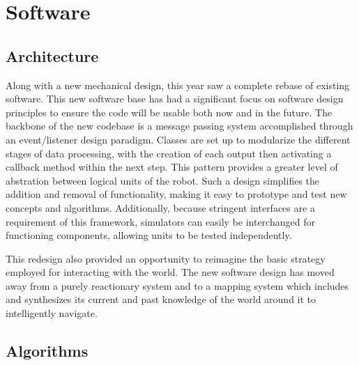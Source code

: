 

\section{Software}
\subsection{Architecture}
Along with a new mechanical design, this year saw a complete rebase of existing software. This new software base has had a significant focus on software design principles to ensure the code will be usable both now and in the future. The backbone of the new codebase is a message passing system accomplished through an event/listener design paradigm. Classes are set up to modularize the different stages of data processing, with the creation of each output then activating a callback method within the next step. This pattern provides a greater level of abstration between logical units of the robot. Such a design simplifies the addition and removal of functionality, making it easy to prototype and test new concepts and algorithms. Additionally, because stringent interfaces are a requirement of this framework, simulators can easily be interchanged for functioning components, allowing units to be tested independently.

This redesign also provided an opportunity to reimagine the basic strategy employed for interacting with the world. The new software design has moved away from a purely reactionary system and to a mapping system which includes and synthesizes its current and past knowledge of the world around it to intelligently navigate.

\subsection{Algorithms}
